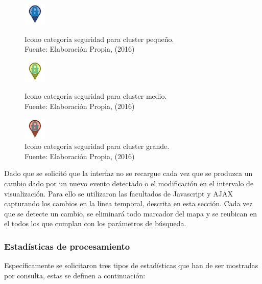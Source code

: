 \begin{figure}[H]
	\centering
	\captionsetup{justification=centering}
	\includegraphics[scale=1]{images/categorias/seguridadS.png}
	\caption[Icono categoría seguridad para cluster pequeño.]{Icono categoría seguridad para cluster pequeño.\\Fuente: Elaboración Propia, (2016)}
	\label{fig:seguridadS}
	\endminipage\hfill
	\centering
	\captionsetup{justification=centering}
	\includegraphics[scale=1]{images/categorias/seguridadM.png}
	\caption[Icono categoría seguridad para cluster medio.]{Icono categoría seguridad para cluster medio.\\Fuente: Elaboración Propia, (2016)}
	\label{fig:seguridadM}
	\endminipage\hfill
	\centering
	\captionsetup{justification=centering}
	\includegraphics[scale=1]{images/categorias/seguridadL.png}
	\caption[Icono categoría seguridad para cluster grande.]{Icono categoría seguridad para cluster grande.\\Fuente: Elaboración Propia, (2016)}
	\label{fig:seguridadL}
	\endminipage\hfill
\end{figure}

Dado que se solicitó que la interfaz no se recargue cada vez que se produzca un cambio dado por un nuevo evento detectado o el modificación en el intervalo de visualización. Para ello se utilizaron las facultados de Javascript y AJAX capturando los cambios en la línea temporal, descrita en esta sección. Cada vez que se detecte un cambio, se eliminará todo marcador del mapa y se reubican en el todos los que cumplan con los parámetros de búsqueda.

\subsubsection*{Estadísticas de procesamiento}
\label{subsubsec:estadisticasdeproc}

Específicamente se solicitaron tres tipos de estadísticas que han de ser mostradas por consulta, estas se definen a continuación:

